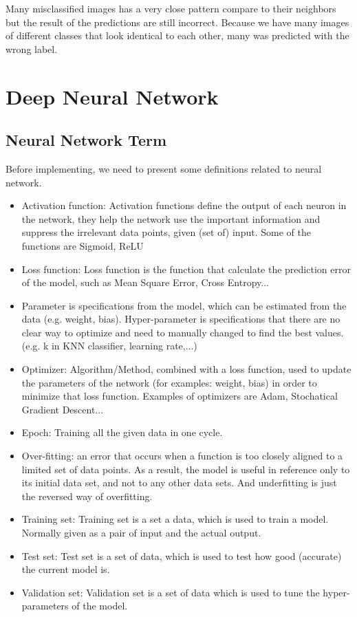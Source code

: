 \documentclass[11pt]{article}
\begin{document}
Many misclassified images has a very close pattern compare to their neighbors but the result of the predictions are still incorrect. Because we have many images of different classes that look identical to each other, many was predicted with the wrong label.

\section{Deep Neural Network}
\subsection{Neural Network Term}

Before implementing, we need to present some definitions related to neural network.
\begin{itemize}
    \item Activation function: Activation functions define the output of each neuron in the network, they help the network use the important information and suppress the irrelevant data points, given (set of) input. Some of the functions are Sigmoid, ReLU
    \item Loss function: Loss function is the function that calculate the prediction error of the model, such as Mean Square Error, Cross Entropy...
    \item Parameter is specifications from the model, which can be estimated from the data (e.g. weight, bias). Hyper-parameter is specifications that there are no clear way to optimize and need to manually changed to find the best values. (e.g. k in KNN classifier, learning rate,...)
    \item Optimizer: Algorithm/Method, combined with a loss function, used to update the parameters of the network (for examples: weight, bias) in order to minimize that loss function. Examples of optimizers are Adam, Stochatical Gradient Descent...
    \item Epoch: Training all the given data in one cycle.
    \item Over-fitting: an error that occurs when a function is too closely aligned to a limited set of data points. As a result, the model is useful in reference only to its initial data set, and not to any other data sets. And underfitting is just the reversed way of overfitting.
    \item Training set: Training set is a set a data, which is used to train a model. Normally given as a pair of input and the actual output.
    \item Test set: Test set is a set of data, which is used to test how good (accurate) the current model is.
    \item Validation set: Validation set is a set of data which is used to tune the hyper-parameters of the model.
\end{itemize}
\end{document}

